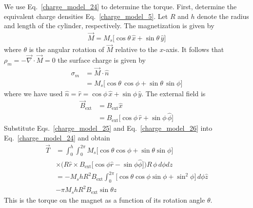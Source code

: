 \documentclass[12pt,a4paper,oneside]{book}
\begin{document}
\begin{onehalfspace}
\begin{example}
	We use Eq.~\eqref{charge_model_24} to determine the torque. First, determine the equivalent charge densities Eq.~\eqref{charge_model_5}. Let $R$ and $h$ denote the radius and length of the cylinder, respectively. The magnetization is given by
	\begin{equation*}\label{}
		{\begin{aligned}
				\vec{M} = M_s\Big[\cos\theta\,\hat{x}+\sin\theta\,\hat{y}\Big]
		\end{aligned}}
	\end{equation*} 
where $\theta$ is the angular rotation of $\vec{M}$ relative to the $x$-axis. It follows that $\rho_m=-\vec{\nabla}\cdot\vec{M}=0$ the surface charge is given by
	\begin{equation}\label{charge_model_25}
	{\begin{aligned}
			\sigma_m &=\vec{M}\cdot\hat{n} \\[6pt] &= M_s\Big[\cos\theta\,\cos\phi+\sin\theta\,\sin\phi\Big]
	\end{aligned}}
	\end{equation} 
where we have used $\hat{n}=\hat{r}=\cos\phi\,\hat{x}+\sin\phi\,\hat{y}$. The external field is
\begin{equation}\label{charge_model_26}
{\begin{aligned}
		\vec{B}_\text{ext} &=B_\text{ext}\hat{x} \\[6pt] 
		&= B_\text{ext}\Big[\cos\phi\,\hat{r}+\sin\phi\,\hat{\phi}\Big]
\end{aligned}}
\end{equation} 
Substitute Eqs.~\eqref{charge_model_25} and Eq.~\eqref{charge_model_26} into Eq.~\eqref{charge_model_24} and obtain
\begin{equation}\label{charge_model_27}
	{\begin{aligned}
			\vec{T} &= \int_{0}^{h} \int_{0}^{2\pi} M_s\Big[\cos\theta\cos\phi+\sin\theta\sin\phi\Big] \\[6pt]
			&\times\Big(R\hat{r} \times B_\text{ext} \Big[\cos\phi\hat{r}-\sin\phi\hat{\phi}\Big]\Big) R\,\phi\,d\phi dz  \\[6pt]
			&= -M_shR^2B_\text{ext}\int_{0}^{2\pi}\Big[\cos\theta\cos\phi\sin\phi+\sin^2\phi\Big]\,d\phi\hat{z} \\[6pt]
			&-\pi M_s h R^2 B_\text{ext}\sin\theta\hat{z}
	\end{aligned}}
\end{equation} 
This is the torque on the magnet as a function of its rotation angle $\theta$.
\end{example}



\end{onehalfspace}
\end{document}
